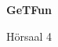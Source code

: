 \documentclass[a4paper]{article}
\begin{document}
\printGenericVSLHeader
\begin{center}
\begin{vsltext}{3cm}{4cm}

   \vspace{0.5cm} 

    \textbf{GeTFun} 

    \vspace{1.5cm}

    Hörsaal 4

\end{vsltext}

\end{center}
\end{document}
